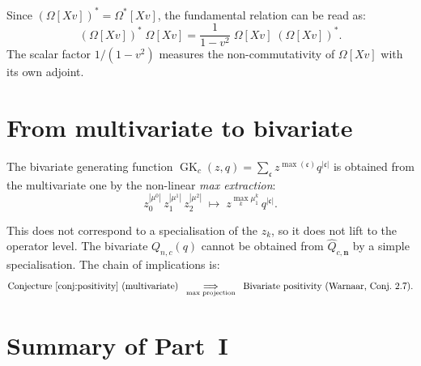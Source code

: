 \documentclass[11pt]{article}
\newcommand{\GK}{\operatorname{GK}}
\theoremstyle{plain}
\theoremstyle{definition}
\begin{document}
Since $(\Omega[Xv])^* = \Omega^*[Xv]$, the fundamental relation
can be read as:
\begin{equation}\label{eq:self-comm}
  (\Omega[Xv])^*\;\Omega[Xv]
  = \frac{1}{1 - v^2}\;\Omega[Xv]\;(\Omega[Xv])^*.
\end{equation}
The scalar factor $1/(1-v^2)$ measures the non-commutativity of
$\Omega[Xv]$ with its own adjoint.


\section{From multivariate to bivariate}
\label{sec:multi-to-bi}

The bivariate generating function $\GK_c(z,q) = \sum_\mathfrak{c}
z^{\max(\mathfrak{c})} q^{|\mathfrak{c}|}$ is obtained from the
multivariate one by the non-linear \emph{max extraction}:
\[
  z_0^{|\mu^0|}\, z_1^{|\mu^1|}\, z_2^{|\mu^2|}
  \;\longmapsto\;
  z^{\max_k \mu^k_1}\, q^{|\mathfrak{c}|}.
\]

This does not correspond to a specialisation of the $z_k$, so it
does not lift to the operator level.  The bivariate $Q_{n,c}(q)$
cannot be obtained from $\hat{Q}_{c,\mathbf{n}}$ by a simple
specialisation.  The chain of implications is:
\[
  \text{Conjecture~\ref{conj:positivity}
  (multivariate)}
  \;\;\underset{\text{max projection}}{\Longrightarrow}\;\;
  \text{Bivariate positivity (Warnaar, Conj.~2.7)}.
\]


\section{Summary of Part~I}
\label{sec:summary-I}
\end{document}
